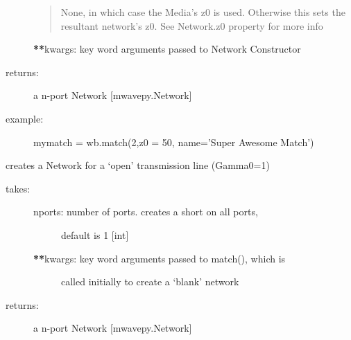\documentclass[letterpaper,10pt,english]{sphinxmanual}
\begin{document}
\begin{fulllineitems}
\begin{fulllineitems}
\begin{description}
\begin{quote}
None, in which case the Media's z0 is used. 
Otherwise this sets the resultant network's z0. See
Network.z0 property for more info
\end{quote}

{\color{red}\bfseries{}**}kwargs: key word arguments passed to Network Constructor

\item[{returns:}] \leavevmode
a n-port Network {[}mwavepy.Network{]}

\item[{example:}] \leavevmode
mymatch = wb.match(2,z0 = 50, name='Super Awesome Match')

\end{description}

\end{fulllineitems}


\begin{fulllineitems}
\label{api/mwavepy.media:mwavepy.media.media.Media.open}
creates a Network for a `open' transmission line (Gamma0=1)
\begin{description}
\item[{takes:}] \leavevmode\begin{description}
\item[{nports: number of ports. creates a short on all ports,}] \leavevmode
default is 1 {[}int{]}

\item[{{\color{red}\bfseries{}**}kwargs: key word arguments passed to match(), which is }] \leavevmode
called initially to create a `blank' network

\end{description}

\item[{returns:}] \leavevmode
a n-port Network {[}mwavepy.Network{]}

\end{description}

\end{fulllineitems}


\begin{fulllineitems}
\label{api/mwavepy.media:mwavepy.media.media.Media.propagation_constant}
\end{fulllineitems}


\end{fulllineitems}
\end{document}
